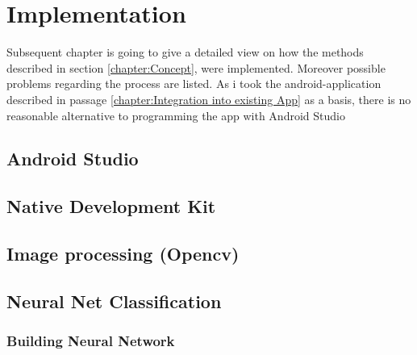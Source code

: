 
\chapter{Implementation}\label{chapter:Implementation}
Subsequent chapter is going to give a detailed view on how the methods described in section \ref{chapter:Concept}, were implemented. Moreover possible problems regarding the process are listed. 
As i took the android-application described in passage \ref{chapter:Integration into existing App} as a basis, there is no reasonable alternative to programming the app with Android Studio 
\section{Android Studio}

\section{Native Development Kit}

\section{Image processing (Opencv)}

\section{Neural Net Classification}
\subsection{Building Neural Network}
